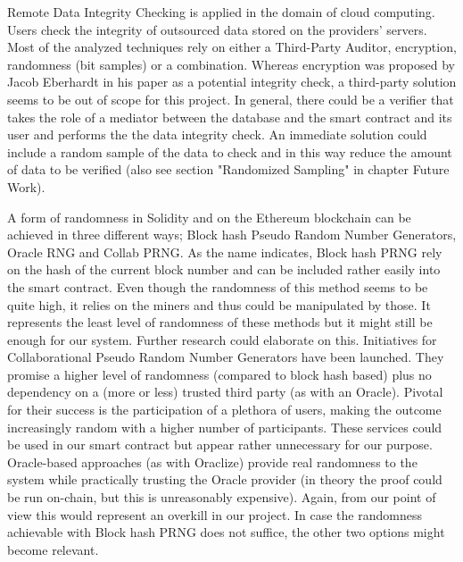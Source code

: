 Remote Data Integrity Checking is applied in the domain of cloud computing. Users check the integrity of outsourced data stored on the providers’ servers. Most of the analyzed techniques rely on either a Third-Party Auditor, encryption, randomness (bit samples) or a combination. Whereas encryption was proposed by Jacob Eberhardt in his paper as a potential integrity check, a third-party solution seems to be out of scope for this project. In general, there could be a verifier that takes the role of a mediator between the database and the smart contract and its user and performs the the data integrity check. An immediate solution could include a random sample of the data to check and in this way reduce the amount of data to be verified (also see section "Randomized Sampling" in chapter Future Work).

A form of randomness in Solidity and on the Ethereum blockchain can be achieved in three different ways; Block hash Pseudo Random Number Generators, Oracle RNG and Collab PRNG.
As the name indicates, Block hash PRNG rely on the hash of the current block number and can be included rather easily into the smart contract. Even though the randomness of this method seems to be quite high, it relies on the miners and thus could be manipulated by those. It represents the least level of randomness of these methods but it might still be enough for our system. Further research could elaborate on this.
Initiatives for Collaborational Pseudo Random Number Generators have been launched. They promise a higher level of randomness (compared to block hash based) plus no dependency on a (more or less) trusted third party (as with an Oracle). Pivotal for their success is the participation of a plethora of users, making the outcome increasingly random with a higher number of participants. These services could be used in our smart contract but appear rather unnecessary for our purpose.
Oracle-based approaches (as with Oraclize) provide real randomness to the system while practically trusting the Oracle provider (in theory the proof could be run on-chain, but this is unreasonably expensive). Again, from our point of view this would represent an overkill in our project.
In case the randomness achievable with Block hash PRNG does not suffice, the other two options might become relevant.
